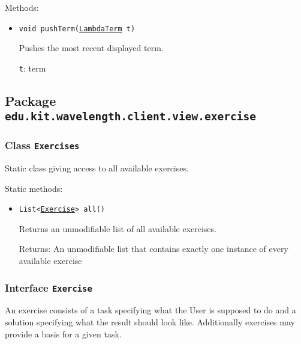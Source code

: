Methods:
\begin{itemize}
\item \texttt{void pushTerm(\hyperref[type:edu.kit.wavelength.client.model.term.LambdaTerm]{LambdaTerm} t)}

Pushes the most recent displayed term.

\texttt{t}: term

\end{itemize}

\subsection{Package \lstinline{edu.kit.wavelength.client.view.exercise}}
\label{pkg:edu.kit.wavelength.client.view.exercise}


\subsubsection{Class \texttt{Exercises}}
\label{type:edu.kit.wavelength.client.view.exercise.Exercises}
Static class giving access to all available exercises.

Static methods:
\begin{itemize}
\item \texttt{List<\hyperref[type:edu.kit.wavelength.client.view.exercise.Exercise]{Exercise}> all()}

Returns an unmodifiable list of all available exercises.

Returns: An unmodifiable list that contains exactly one instance of every
         available exercise

\end{itemize}

\subsubsection{Interface \texttt{Exercise}}
\label{type:edu.kit.wavelength.client.view.exercise.Exercise}
An exercise consists of a task specifying what the User is supposed to do and
 a solution specifying what the result should look like. Additionally
 exercises may provide a basis for a given task.

